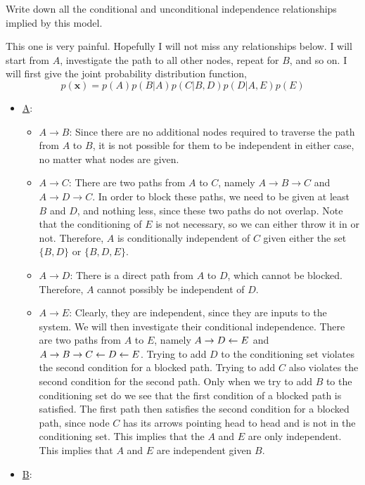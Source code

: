 Write down all the conditional and unconditional independence relationships implied by this model. 
\partbreak
\begin{solution}

    This one is very painful. Hopefully I will not miss any relationships below. I will start from $A$, investigate the path to all other nodes, repeat for $B$, and so on. I will first give the joint probability distribution function, 
    \[p(\textbf{x}) = p(A)p(B | A)p(C | B, D)p(D | A, E)p(E)\]
    \begin{itemize}
        \item \underline{A}:
        \begin{itemize}
            \item \underline{$A \to B$}: Since there are no additional nodes required to traverse the path from $A$ to $B$, it is not possible for them to be independent in either case, no matter what nodes are given.
            \item \underline{$A \to C$}: There are two paths from $A$ to $C$, namely $A \to B \to C$ and $A \to D \to C$. In order to block these paths, we need to be given at least $B$ and $D$, and nothing less, since these two paths do not overlap. Note that the conditioning of $E$ is not necessary, so we can either throw it in or not. Therefore, $A$ is conditionally independent of $C$ given either the set $\{B, D\}$ or $\{B, D, E\}$. 
            \item \underline{$A \to D$}: There is a direct path from $A$ to $D$, which cannot be blocked. Therefore, $A$ cannot possibly be independent of $D$. 
            \item \underline{$A \to E$}: Clearly, they are independent, since they are inputs to the system. We will then investigate their conditional independence. There are two paths from $A$ to $E$, namely $A \to D \leftarrow E$ and $A \to B \to C \leftarrow D \leftarrow E$. Trying to add $D$ to the conditioning set violates the second condition for a blocked path. Trying to add $C$ also violates the second condition for the second path. Only when we try to add $B$ to the conditioning set do we see that the first condition of a blocked path is satisfied. The first path then satisfies the second condition for a blocked path, since node $C$ has its arrows pointing head to head and is not in the conditioning set. This implies that the $A$ and $E$ are only independent. This implies that $A$ and $E$ are independent given $B$.
        \end{itemize}
        \item \underline{B}:

\end{itemize}
\end{solution}
